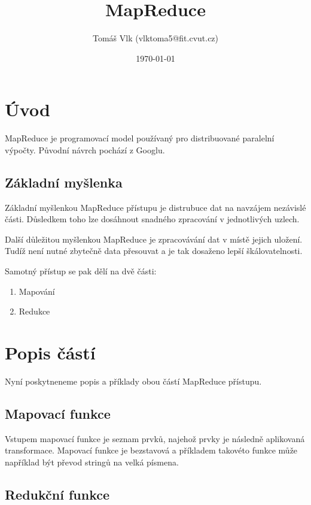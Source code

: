 \documentclass{article}
\title{MapReduce\vspace{-1em}}
\author{Tomáš Vlk (vlktoma5@fit.cvut.cz)}
\date{\today}
\begin{document}
\maketitle

\section*{Úvod}

MapReduce je programovací model používaný pro distribuované paralelní výpočty. Původní návrch pochází z Googlu.

\subsection*{Základní myšlenka}

Základní myšlenkou MapReduce přístupu je distrubuce dat na navzájem nezávislé části. Důsledkem toho lze dosáhnout snadného zpracování v jednotlivých uzlech.\par

Další důležitou myšlenkou MapReduce je zpracovávání dat v místě jejich uložení. Tudíž není nutné zbytečně data přesouvat a je tak dosaženo lepší škálovatelnosti.

Samotný přístup se pak dělí na dvě části:

\begin{enumerate}
\item Mapování
\item Redukce
\end{enumerate}

\section*{Popis částí}

Nyní poskytneneme popis a příklady obou částí MapReduce přístupu.

\subsection*{Mapovací funkce}

Vstupem mapovací funkce je seznam prvků, najehož prvky je následně aplikovaná transformace. Mapovací funkce je bezstavová a příkladem takovéto funkce může například být převod stringů na velká písmena.

\subsection*{Redukční funkce}
\end{document}
